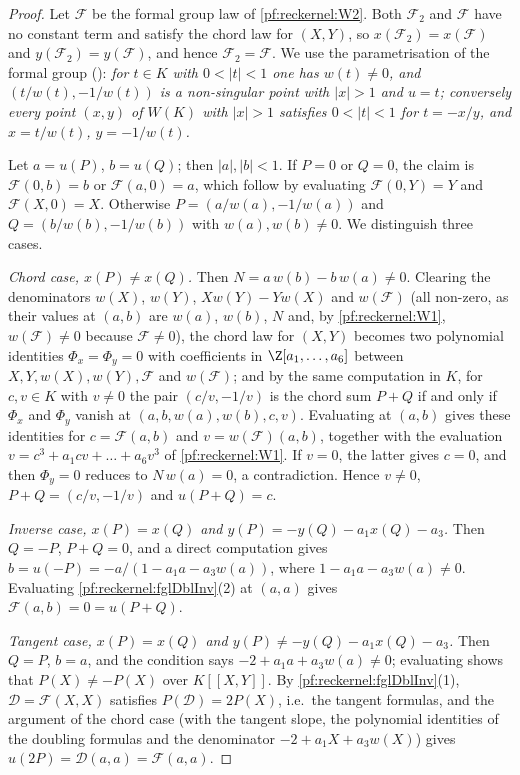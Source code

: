 \begin{proof}
Let $\mathcal F$ be the formal group law of \ref{pf:reckernel:W2}. Both $\mathcal F_2$ and $\mathcal F$ have no constant term and
satisfy the chord law for $(X,Y)$, so $x(\mathcal F_2)=x(\mathcal F)$ and $y(\mathcal F_2)=y(\mathcal F)$, and hence
$\mathcal F_2=\mathcal F$. We use the parametrisation of the formal group
(): \emph{for $t\in K$ with $0<|t|<1$ one has $w(t)\ne0$, and
$(t/w(t),-1/w(t))$ is a non-singular point with $|x|>1$ and $u=t$; conversely every point $(x,y)$ of $W(K)$ with $|x|>1$
satisfies $0<|t|<1$ for $t=-x/y$, and $x=t/w(t)$, $y=-1/w(t)$.}

Let $a=u(P)$, $b=u(Q)$; then $|a|,|b|<1$. If $P=0$ or $Q=0$, the claim is $\mathcal F(0,b)=b$ or $\mathcal F(a,0)=a$,
which follow by evaluating $\mathcal F(0,Y)=Y$ and $\mathcal F(X,0)=X$. Otherwise $P=(a/w(a),-1/w(a))$ and
$Q=(b/w(b),-1/w(b))$ with $w(a),w(b)\ne0$. We distinguish three cases.

\emph{Chord case, $x(P)\ne x(Q)$.} Then $N=a\,w(b)-b\,w(a)\ne0$. Clearing the denominators $w(X)$, $w(Y)$,
$Xw(Y)-Yw(X)$ and $w(\mathcal F)$ (all non-zero, as their values at $(a,b)$ are $w(a)$, $w(b)$, $N$ and, by
\ref{pf:reckernel:W1}, $w(\mathcal F)\ne0$ because $\mathcal F\ne0$), the chord law for $(X,Y)$ becomes two polynomial identities
$\Phi_x=\Phi_y=0$ with coefficients in $\Z[a_1,\dots,a_6]$ between $X,Y,w(X),w(Y),\mathcal F$ and $w(\mathcal F)$; and by the same
computation in $K$, for $c,v\in K$ with $v\ne0$ the pair $(c/v,-1/v)$ is the chord sum $P+Q$ if and only if
$\Phi_x$ and $\Phi_y$ vanish at $(a,b,w(a),w(b),c,v)$. Evaluating at $(a,b)$ gives these identities for $c=\mathcal F(a,b)$ and
$v=w(\mathcal F)(a,b)$, together with the evaluation $v=c^3+a_1cv+\dots+a_6v^3$ of \ref{pf:reckernel:W1}. If $v=0$, the
latter gives $c=0$, and then $\Phi_y=0$ reduces to $N\,w(a)=0$, a contradiction. Hence $v\ne0$, $P+Q=(c/v,-1/v)$ and
$u(P+Q)=c$.

\emph{Inverse case, $x(P)=x(Q)$ and $y(P)=-y(Q)-a_1x(Q)-a_3$.} Then $Q=-P$, $P+Q=0$, and a direct computation gives
$b=u(-P)=-a/(1-a_1a-a_3w(a))$, where $1-a_1a-a_3w(a)\ne0$. Evaluating \cref{pf:reckernel:fglDblInv}(2) at $(a,a)$ gives
$\mathcal F(a,b)=0=u(P+Q)$.

\emph{Tangent case, $x(P)=x(Q)$ and $y(P)\ne-y(Q)-a_1x(Q)-a_3$.} Then $Q=P$, $b=a$, and the condition says
$-2+a_1a+a_3w(a)\ne0$; evaluating shows that $P(X)\ne-P(X)$ over $K[[X,Y]]$. By \cref{pf:reckernel:fglDblInv}(1), $\mathcal D=\mathcal F(X,X)$
satisfies $P(\mathcal D)=2P(X)$, i.e.\ the tangent formulas, and the argument of the chord case (with the tangent slope,
the polynomial identities of the doubling formulas and the denominator $-2+a_1X+a_3w(X)$) gives
$u(2P)=\mathcal D(a,a)=\mathcal F(a,a)$.
\end{proof}

